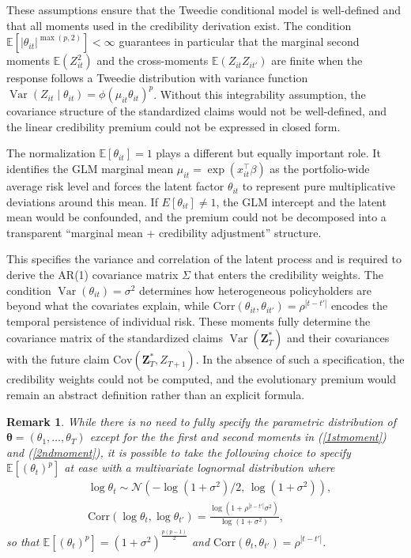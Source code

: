\documentclass{sfuthesis}
\numberwithin{equation}{chapter}
\newtheorem{remark}{Remark}
\begin{document}
These assumptions ensure that the Tweedie conditional model is well-defined
and that all moments used in the credibility derivation exist. The condition
\(\mathbb{E}[|\theta_{it}|^{\max(p,2)}] < \infty\) guarantees in particular that the marginal
second moments \(\mathbb{E}(Z_{it}^2)\) and the cross-moments \(\mathbb{E}(Z_{it} Z_{it'})\) are
finite when the response follows a Tweedie distribution with variance function
\(\operatorname{Var}(Z_{it} \mid \theta_{it}) = \phi (\mu_{it} \theta_{it})^{p}\). Without this integrability
assumption, the covariance structure of the standardized claims would not be
well-defined, and the linear credibility premium could not be expressed in
closed form.

The normalization \(\mathbb{E}[\theta_{it}] = 1\) plays a different but equally important
role. It identifies the GLM marginal mean \(\mu_{it} = \exp(x_{it}^\top \beta)\) as the
portfolio-wide average risk level and forces the latent factor \(\theta_{it}\) to
represent pure multiplicative deviations around this mean. If \(E[\theta_{it}]
\neq 1\), the GLM intercept and the latent mean would be confounded, and the
premium could not be decomposed into a transparent ``marginal mean + credibility
adjustment'' structure.

This specifies the variance and correlation of the latent process
and is required to derive the AR(1) covariance matrix \(\Sigma\) that enters the
credibility weights. The condition \(\operatorname{Var}(\theta_{it}) = \sigma^{2}\) determines how
heterogeneous policyholders are beyond what the covariates explain, while
\(\mathrm{Corr}(\theta_{it}, \theta_{it'}) = \rho^{|t-t'|}\) encodes the temporal persistence of
individual risk. These moments fully determine the covariance matrix of the
standardized claims \(\operatorname{Var}(\bm{Z}^{\ast}_{T})\) and their covariances with the future claim
\(\mathrm{Cov}(\bm{Z}^{\ast}_{T}, Z_{T+1})\). In the absence of such a specification, the
credibility weights could not be computed, and the evolutionary premium would
remain an abstract definition rather than an explicit formula.



\begin{remark}
While there is no need to fully specify the parametric distribution of $\bm{\theta}=(\theta_1, \ldots, \theta_T)$ except for the the first and second moments in (\ref{1stmoment}) and (\ref{2ndmoment}), it is possible to take the following choice to specify $\mathbb{E}[(\theta_t)^{p}]$ at ease with a multivariate lognormal distribution where \begin{equation}\label{eq:multiln}
\begin{aligned}
& \log\theta_t  \sim \mathcal{N}\left(-\log(1+\sigma^2)/2,\, \log(1+\sigma^2) \right), \\
& \text{Corr}(\log \theta_t, \log \theta_{t'})=\frac{\log (1+\rho^{|t-t'|}\sigma^2)}{\log(1+\sigma^2)},
\end{aligned}
\end{equation}
so that $\mathbb{E}[(\theta_t)^{p}]=(1+\sigma^2)^{\frac{p(p-1)}{2}}$ and $\text{Corr}(\theta_t, \theta_{t'})=\rho^{|t-t'|}$.
\end{remark}
\end{document}
